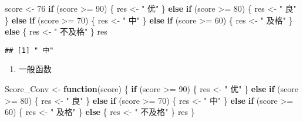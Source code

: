 \documentclass[
]{book}
\newenvironment{Shaded}{\begin{snugshade}}{\end{snugshade}}
\newcommand{\ControlFlowTok}[1]{\textcolor[rgb]{0.13,0.29,0.53}{\textbf{#1}}}
\newcommand{\DecValTok}[1]{\textcolor[rgb]{0.00,0.00,0.81}{#1}}
\newcommand{\NormalTok}[1]{#1}
\newcommand{\OtherTok}[1]{\textcolor[rgb]{0.56,0.35,0.01}{#1}}
\newcommand{\SpecialCharTok}[1]{\textcolor[rgb]{0.00,0.00,0.00}{#1}}
\newcommand{\StringTok}[1]{\textcolor[rgb]{0.31,0.60,0.02}{#1}}
\providecommand{\tightlist}{%
  \setlength{\itemsep}{0pt}\setlength{\parskip}{0pt}}
\begin{document}
\begin{Shaded}
\begin{Highlighting}[]
\NormalTok{score }\OtherTok{\textless{}{-}} \DecValTok{76}
\ControlFlowTok{if}\NormalTok{ (score }\SpecialCharTok{\textgreater{}=} \DecValTok{90}\NormalTok{) \{}
\NormalTok{  res }\OtherTok{\textless{}{-}} \StringTok{" 优"}
\NormalTok{\} }\ControlFlowTok{else} \ControlFlowTok{if}\NormalTok{ (score }\SpecialCharTok{\textgreater{}=} \DecValTok{80}\NormalTok{) \{}
\NormalTok{  res }\OtherTok{\textless{}{-}} \StringTok{" 良"}
\NormalTok{\} }\ControlFlowTok{else} \ControlFlowTok{if}\NormalTok{ (score }\SpecialCharTok{\textgreater{}=} \DecValTok{70}\NormalTok{) \{}
\NormalTok{  res }\OtherTok{\textless{}{-}} \StringTok{" 中"}
\NormalTok{\} }\ControlFlowTok{else} \ControlFlowTok{if}\NormalTok{ (score }\SpecialCharTok{\textgreater{}=} \DecValTok{60}\NormalTok{) \{}
\NormalTok{  res }\OtherTok{\textless{}{-}} \StringTok{" 及格"}
\NormalTok{\} }\ControlFlowTok{else}\NormalTok{ \{}
\NormalTok{  res }\OtherTok{\textless{}{-}} \StringTok{" 不及格"}
\NormalTok{\}}
\NormalTok{res}
\end{Highlighting}
\end{Shaded}

\begin{verbatim}
## [1] " 中"
\end{verbatim}

\begin{enumerate}
\def\labelenumi{\arabic{enumi}.}
\setcounter{enumi}{1}
\tightlist
\item
  一般函数
\end{enumerate}

\begin{Shaded}
\begin{Highlighting}[]
\NormalTok{Score\_Conv }\OtherTok{\textless{}{-}} \ControlFlowTok{function}\NormalTok{(score) \{}
  \ControlFlowTok{if}\NormalTok{ (score }\SpecialCharTok{\textgreater{}=} \DecValTok{90}\NormalTok{) \{}
\NormalTok{    res }\OtherTok{\textless{}{-}} \StringTok{" 优"}
\NormalTok{  \} }\ControlFlowTok{else} \ControlFlowTok{if}\NormalTok{ (score }\SpecialCharTok{\textgreater{}=} \DecValTok{80}\NormalTok{) \{}
\NormalTok{    res }\OtherTok{\textless{}{-}} \StringTok{" 良"}
\NormalTok{  \} }\ControlFlowTok{else} \ControlFlowTok{if}\NormalTok{ (score }\SpecialCharTok{\textgreater{}=} \DecValTok{70}\NormalTok{) \{}
\NormalTok{    res }\OtherTok{\textless{}{-}} \StringTok{" 中"}
\NormalTok{  \} }\ControlFlowTok{else} \ControlFlowTok{if}\NormalTok{ (score }\SpecialCharTok{\textgreater{}=} \DecValTok{60}\NormalTok{) \{}
\NormalTok{    res }\OtherTok{\textless{}{-}} \StringTok{" 及格"}
\NormalTok{  \} }\ControlFlowTok{else}\NormalTok{ \{}
\NormalTok{    res }\OtherTok{\textless{}{-}} \StringTok{" 不及格"}
\NormalTok{  \}}
\NormalTok{  res}
\NormalTok{\}}
\end{Highlighting}
\end{Shaded}
\end{document}
